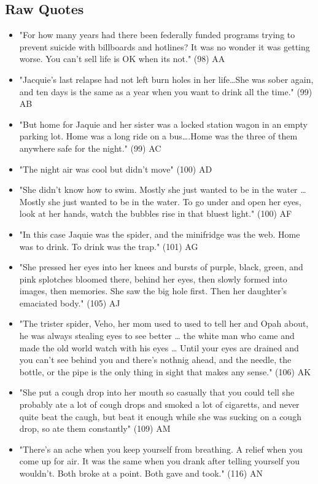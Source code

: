 \documentclass[letterpaper]{article}
\begin{document}
\subsection{Raw Quotes}
\label{sec:org437a625}
\begin{itemize}
\item "For how many years had there been federally funded programs trying to prevent suicide with billboards and hotlines? It was no wonder it was getting worse. You can't sell life is OK when its not." (98) AA
\item "Jacquie's last relapse had not left burn holes in her life\ldots{}She was sober again, and ten days is the same as a year when you want to drink all the time." (99) AB
\item "But home for Jaquie and her sister was a locked station wagon in an empty parking lot. Home was a long ride on a bus\ldots{}.Home was the three of them anywhere safe for the night." (99) AC
\item "The night air was cool but didn't move" (100) AD
\item "She didn’t know how to swim. Mostly she just wanted to be in the water \ldots{} Mostly she just wanted to be in the water. To go under and open her eyes, look at her hands, watch the bubbles rise in that bluest light." (100) AF
\item "In this case Jaquie was the spider, and the minifridge was the web. Home was to drink. To drink was the trap." (101) AG
\item "She pressed her eyes into her knees and bursts of purple, black, green, and pink splotches bloomed there, behind her eyes, then slowly formed into images, then memories. She saw the big hole first. Then her daughter's emaciated body." (105) AJ
\item "The trister spider, Veho, her mom used to used to tell her and Opah about, he was always stealing eyes to see better \ldots{} the white man who came and made the old world watch with his eyes \ldots{} Until your eyes are drained and you can't see behind you and there's nothnig ahead, and the needle, the bottle, or the pipe is the only thing in sight that makes any sense." (106) AK
\item "She put a cough drop into her mouth so casually that you could tell she probably ate a lot of cough drops and smoked a lot of cigaretts, and never quite beat the caugh, but beat it enough while she was sucking on a cough drop, so ate them constantly" (109) AM
\item "There's an ache when you keep yourself from breathing. A relief when you come up for air. It was the same when you drank after telling yourself you wouldn't. Both broke at a point. Both gave and took." (116) AN

\end{itemize}
\end{document}

